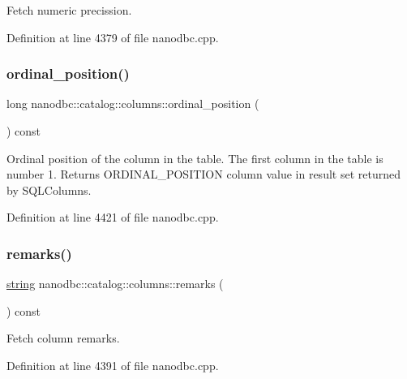 Fetch numeric precission. 



Definition at line 4379 of file nanodbc.\+cpp.

\mbox{\label{classnanodbc_1_1catalog_1_1columns_aeb0328b77da7de19c81b392dfebf6eed}} 
\subsubsection{\texorpdfstring{ordinal\_position()}{ordinal\_position()}}
{\footnotesize\ttfamily long nanodbc\+::catalog\+::columns\+::ordinal\+\_\+position (\begin{DoxyParamCaption}{ }\end{DoxyParamCaption}) const}



Ordinal position of the column in the table. The first column in the table is number 1. Returns O\+R\+D\+I\+N\+A\+L\+\_\+\+P\+O\+S\+I\+T\+I\+ON column value in result set returned by S\+Q\+L\+Columns. 



Definition at line 4421 of file nanodbc.\+cpp.

\mbox{\label{classnanodbc_1_1catalog_1_1columns_a10f43e080211af896295f5d4e90f74ee}} 
\subsubsection{\texorpdfstring{remarks()}{remarks()}}
{\footnotesize\ttfamily \mbox{\hyperlink{namespacenanodbc_abfc0ece56278e590911ec8352774c212}{string}} nanodbc\+::catalog\+::columns\+::remarks (\begin{DoxyParamCaption}{ }\end{DoxyParamCaption}) const}



Fetch column remarks. 



Definition at line 4391 of file nanodbc.\+cpp.

\mbox{\label{classnanodbc_1_1catalog_1_1columns_a1a9224a4cae53eb55ea436978997f45b}} 
